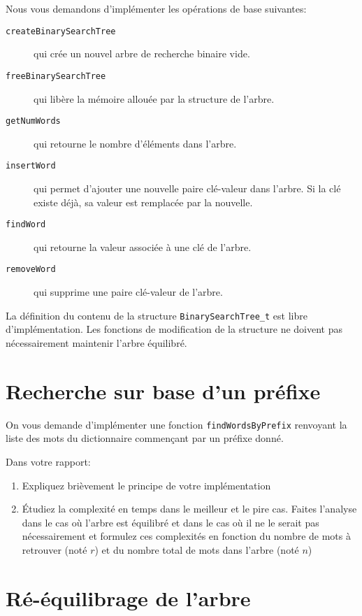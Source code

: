 \documentclass[a4paper,10pt]{article}
\begin{document}
Nous vous demandons d'implémenter les opérations de base suivantes:
\begin{description}
\item[\texttt{createBinarySearchTree}] qui crée un nouvel arbre de recherche binaire vide.
\item[\texttt{freeBinarySearchTree}]  qui libère la mémoire allouée par la structure de l'arbre.
\item[\texttt{getNumWords}] qui retourne le nombre d'éléments dans l'arbre.
\item[\texttt{insertWord}] qui permet d'ajouter une nouvelle paire clé-valeur dans l'arbre. Si la clé existe déjà, sa valeur est remplacée par la nouvelle.
\item[\texttt{findWord}] qui retourne la valeur associée à une clé de l'arbre.
\item[\texttt{removeWord}] qui supprime une paire clé-valeur de l'arbre.
\end{description}
La définition du contenu de la structure \texttt{BinarySearchTree\_t}
est libre d'implémentation. Les fonctions de modification de la
structure ne doivent pas nécessairement maintenir l'arbre équilibré.

\section{Recherche sur base d'un préfixe}

On vous demande d'implémenter une fonction \texttt{findWordsByPrefix}
renvoyant la liste des mots du dictionnaire commençant par un préfixe
donné.

Dans votre rapport:
\begin{enumerate}
\item Expliquez brièvement le principe de votre implémentation
\item \'Etudiez la complexité en temps dans le meilleur et le pire
  cas. Faites l'analyse dans le cas où l'arbre est équilibré et dans
  le cas où il ne le serait pas nécessairement et formulez ces
  complexités en fonction du nombre de mots à retrouver (noté $r$) et
  du nombre total de mots dans l'arbre (noté $n$)
\end{enumerate}

\section{Ré-équilibrage de l'arbre}
\end{document}
